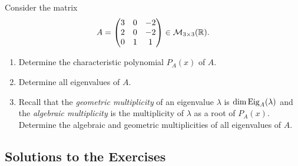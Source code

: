 \begin{exercise}
  \label{exc:multiplicities_3x3_matrix}
  Consider the matrix
  \[
  A = \begin{pmatrix}
    3 & 0 & -2 \\
    2 & 0 & -2 \\
    0 & 1 & 1
  \end{pmatrix} \in \mathcal{M}_{3 \times 3}(\mathbb{R}).
  \]
  \begin{enumerate}[label=\textbf{(\alph*)}]
    \item Determine the characteristic polynomial $P_A(x)$ of $A$.
    \item Determine all eigenvalues of $A$.
    \item Recall that the \emph{geometric multiplicity} of an eigenvalue $\lambda$ is $\dim \operatorname{Eig}_A(\lambda)$ and the \emph{algebraic multiplicity} is the multiplicity of $\lambda$ as a root of $P_A(x)$. Determine the algebraic and geometric multiplicities of all eigenvalues of $A$.
  \end{enumerate}
\end{exercise}

\subsection{Solutions to the Exercises}
\label{sec:solutions_multiplicities}

